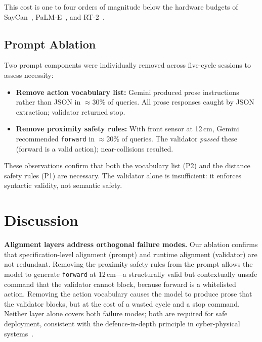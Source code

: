 \documentclass[conference]{IEEEtran}
\begin{document}
This cost is one to four orders of magnitude below the hardware budgets of
SayCan~\cite{ahn2022saycan}, PaLM-E~\cite{driess2023palme}, and
RT-2~\cite{brohan2023rt2}.

\subsection{Prompt Ablation}

Two prompt components were individually removed across five-cycle sessions
to assess necessity:
\begin{itemize}[leftmargin=*, nosep]
  \item \textbf{Remove action vocabulary list:} Gemini produced prose
        instructions rather than JSON in $\approx$30\% of queries.
        All prose responses caught by JSON extraction; validator returned stop.
  \item \textbf{Remove proximity safety rules:} With front sensor at 12\,cm,
        Gemini recommended \texttt{forward} in $\approx$20\% of queries.
        The validator \emph{passed} these (forward is a valid action);
        near-collisions resulted.
\end{itemize}
These observations confirm that both the vocabulary list (P2) and the
distance safety rules (P1) are necessary.
The validator alone is insufficient: it enforces syntactic validity,
not semantic safety.

\section{Discussion}
\label{sec:discussion}

\textbf{Alignment layers address orthogonal failure modes.}
Our ablation confirms that specification-level alignment (prompt) and runtime
alignment (validator) are not redundant.
Removing the proximity safety rules from the prompt allows the model to
generate \texttt{forward} at 12\,cm---a structurally valid but contextually
unsafe command that the validator cannot block, because forward is a whitelisted
action.
Removing the action vocabulary causes the model to produce prose that the
validator blocks, but at the cost of a wasted cycle and a stop command.
Neither layer alone covers both failure modes; both are required for safe
deployment, consistent with the defence-in-depth principle in
cyber-physical systems~\cite{amodei2016safety}.
\end{document}
